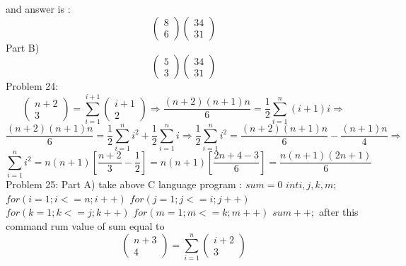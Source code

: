 \documentclass{article}
\begin{document}
	and answer is :
	$$
	\left(\begin{array}{c}
	8\\
	6
	\end{array}\right)
	\left(\begin{array}{c}
	34\\
	31
	\end{array}\right)
	$$
	Part B)
	$$
	\left(\begin{array}{c}
	5\\
	3
	\end{array}\right)
	\left(\begin{array}{c}
	34\\
	31
	\end{array}\right)
	$$
	Problem 24:
	$$
	\left(\begin{array}{c}
	n+2\\
	3
	\end{array}\right)
	=
	\sum_{i=1}^{i+1}
	\left(\begin{array}{c}
	i+1\\
	2
	\end{array}\right)
	\Rightarrow
	\frac{(n+2)(n+1)n}{6}
	=
	\frac{1}{2}
	\sum_{i=1}^{n}(i+1)i
	\Rightarrow
	$$
	$$
	\frac{(n+2)(n+1)n}{6}
	=
	\frac{1}{2}
	\sum_{i=1}^{n}
	i^2
	+
	\frac{1}{2}
	\sum_{i=1}^{n}
	i
	\Rightarrow
	\frac{1}{2}
	\sum_{i=1}^{n}
	i^2
	=
	\frac{(n+2)(n+1)n}{6}
	-
	\frac{(n+1)n}{4}
	\Rightarrow
	$$
	$$
	\sum_{i=1}^{n}
	i^2
	=
	n(n+1)
	\left[
	\frac{n+2}{3}
	-
	\frac{1}{2}
	\right]
	=
	n(n+1)
	\left[
	\frac{2n+4-3}{6}
	\right]
	=
	\frac{n(n+1)(2n+1)}{6}
	$$
	Problem 25: Part A)
	take above C language program :								
	$sum = 0$
	\newline
	$int i,j,k,m;$
	\newline
	\hspace*{10pt} $for(i=1;i<=n;i++)$
	\newline
	\hspace*{20pt} $for(j=1;j<=i;j++)$
	\newline
	\hspace*{30pt} $for(k=1;k<=j;k++)$
	\newline
	\hspace*{40pt} $for(m=1;m<=k;m++)$
	\newline
	\hspace*{50pt} $sum++;$
	\newline
	after this command rum value of sum equal to
	$$
	\left(\begin{array}{c}
	n+3\\
	4
	\end{array}\right)
	=
	\sum_{i=1}^{n}
	\left(\begin{array}{c}
	i+2\\
	3
	\end{array}\right)
	$$
\end{document}
